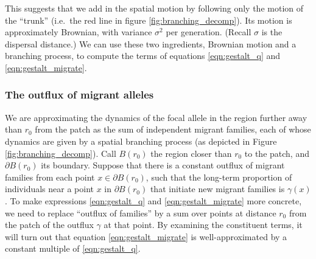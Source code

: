 \documentclass{article}
\begin{document}
This suggests that we add in the spatial motion by following only the motion of the ``trunk''
(i.e.\ the red line in figure \ref{fig:branching_decomp}).
Its motion is approximately Brownian, with variance $\sigma^2$ per generation.
(Recall $\sigma$ is the dispersal distance.)
We can use these two ingredients, Brownian motion and a branching process, 
to compute the terms of equations \eqref{eqn:gestalt_q} and \eqref{eqn:gestalt_migrate}.


\subsubsection{The outflux of migrant alleles}

We are approximating the dynamics of the focal allele in the region further away than $r_0$ from the patch
as the sum of independent migrant families, each of whose dynamics are
given by a spatial branching process (as depicted in Figure \ref{fig:branching_decomp}).
Call $B(r_0)$ the region closer than $r_0$ to the patch, and $\partial B(r_0)$ its boundary.
Suppose that there is a constant outflux of migrant families from each point $x \in \partial B(r_0)$,
such that the long-term proportion of individuals near a point $x$ in $\partial B(r_0)$ that initiate new migrant families
is $\gamma(x)$.
To make expressions \eqref{eqn:gestalt_q} and \eqref{eqn:gestalt_migrate} more concrete,
we need to replace ``outflux of families'' by a sum over points at distance $r_0$ from the patch
of the outflux $\gamma$ at that point.
By examining the constituent terms,
it will turn out that equation \eqref{eqn:gestalt_migrate} 
is well-approximated by a constant multiple of \eqref{eqn:gestalt_q}.
\end{document}
